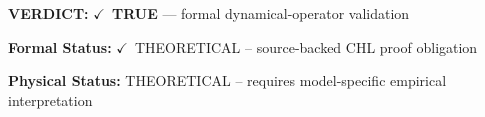 \textbf{VERDICT:} \ensuremath{\checkmark}\ \textbf{TRUE} --- formal dynamical-operator validation

\textbf{Formal Status:} \ensuremath{\checkmark}\ THEORETICAL -- source-backed CHL proof obligation

\textbf{Physical Status:} THEORETICAL -- requires model-specific empirical interpretation
\par\vspace{0.45em}
\par
\ifTZPDarkEdition
{}
\fi
\endgroup
\endgroup
